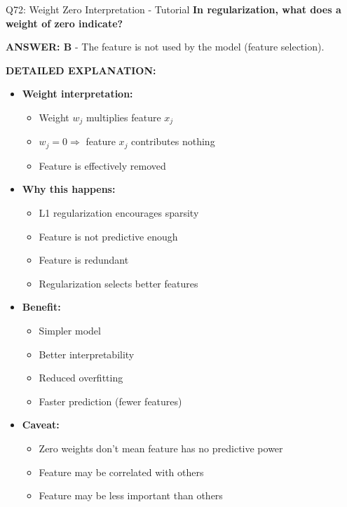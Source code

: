 \documentclass[8pt]{beamer}
\begin{document}
	\begin{frame}{Q72: Weight Zero Interpretation - Tutorial}
		\fontsize{6.5}{7.5}\selectfont
		\textbf{In regularization, what does a weight of zero indicate?}
		
		\vspace{0.05cm}
		\textcolor{myblue}{\textbf{ANSWER: B}} - The feature is not used by the model (feature selection).
		
		\vspace{0.05cm}
		\textbf{DETAILED EXPLANATION:}
		\begin{itemize}
			\item \textbf{Weight interpretation:}
			\begin{itemize}
				\item Weight $w_j$ multiplies feature $x_j$
				\item $w_j = 0 \Rightarrow$ feature $x_j$ contributes nothing
				\item Feature is effectively removed
			\end{itemize}
			\item \textbf{Why this happens:}
			\begin{itemize}
				\item L1 regularization encourages sparsity
				\item Feature is not predictive enough
				\item Feature is redundant
				\item Regularization selects better features
			\end{itemize}
			\item \textbf{Benefit:}
			\begin{itemize}
				\item Simpler model
				\item Better interpretability
				\item Reduced overfitting
				\item Faster prediction (fewer features)
			\end{itemize}
			\item \textbf{Caveat:}
			\begin{itemize}
				\item Zero weights don't mean feature has no predictive power
				\item Feature may be correlated with others
				\item Feature may be less important than others
			\end{itemize}
		\end{itemize}
		

\end{frame}
\end{document}
